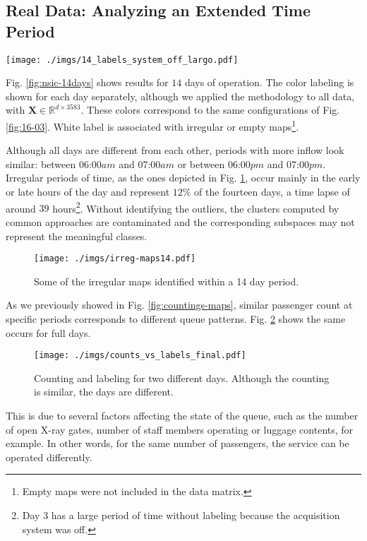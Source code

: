 %
%
\subsection{Real Data: Analyzing an Extended Time Period}
\label{sec:larger-periods}
%
\begin{figure*}[tbh]
\centering
\texttt{[image: ./imgs/14\_labels\_system\_off\_largo.pdf]}
\caption{Results of our methodology for 14 days of data, with $\mathbf{X} \in \mathbb{R}^{d \times 3583}$. Days are shown separately for easier analysis. Each queue configuration is labeled with a different color, with white corresponding to irregular periods. Day 3 has a large period without labeling, identified in gray, because the acquisition system was off.}
\label{fig:nsic-14days}
\end{figure*}
Fig. \ref{fig:nsic-14days} shows results for $14$ days of operation. The color labeling is shown for each day separately, although we applied the methodology to all data, with $\mathbf{X} \in \mathbb{R}^{d \times 3583}$.
These colors correspond to the same configurations of Fig. \ref{fig:16-03}.
White label is associated with irregular or empty maps\footnote{Empty maps were not included in the data matrix.}.

Although all days are different from each other, periods with more inflow look similar: between 06:00$am$ and 07:00$am$ or between 06:00$pm$ and 07:00$pm$. 
Irregular periods of time, as the ones depicted in Fig. \ref{fig:irreg-14days}, occur mainly in the early or late hours of the day and represent $12\%$ of the fourteen days, a time lapse of around $39$ hours\footnote{Day $3$ has a large period of time without labeling because the acquisition system was off.}.
Without identifying the outliers, the clusters computed by common approaches are contaminated and the corresponding subspaces may not represent the meaningful classes.

\begin{figure}[bht]
\centering
\texttt{[image: ./imgs/irreg-maps14.pdf]}
\caption{Some of the irregular maps identified within a 14 day period.}
\label{fig:irreg-14days}
\end{figure}
%

As we previously showed in Fig. \ref{fig:countings-maps}, similar passenger count at specific periods corresponds to different queue patterns. Fig. \ref{fig:counts-vs-labels} shows the same occurs for full days.
\begin{figure}[bht]
\centering
\texttt{[image: ./imgs/counts\_vs\_labels\_final.pdf]}
\caption{Counting and labeling for two different days. Although the counting is similar, the days are different.}
\label{fig:counts-vs-labels}
\end{figure}
%
This is due to several factors affecting the state of the queue, such as the number of open X-ray gates, number of staff members operating or luggage contents, for example. 
In other words, for the same number of passengers, the service can be operated differently.
